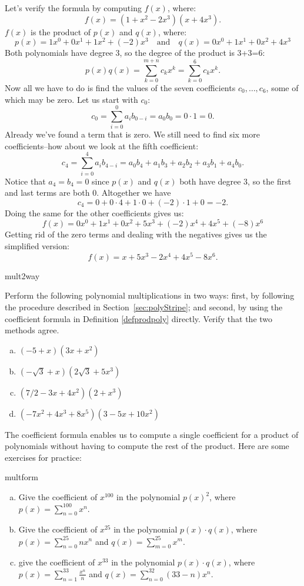 Let's verify the formula by computing $f(x)$, where:
\[ f(x)=(1+x^2-2x^3)(x+4x^3). \]
$f(x)$ is the product of $p(x)$ and $q(x)$, where:
\[p(x)= 1x^0 + 0x^1 + 1x^2 + (-2)x^3  \quad \text{and} \quad q(x)= 0x^0 + 1x^1 + 0x^2 + 4x^3 \]
Both polynomials have degree 3, so the degree of the product is 3+3=6:
\[
p(x) q(x) = \sum_{k=0}^{m+n} c_k  x^k =  \sum_{k=0}^{6} c_k x^k. 
\]
Now all we have to do is find the values of the seven coefficients $c_0, \ldots,c_6$, some of which may be zero.  Let us start with $c_0$:
\[ c_0 = \sum_{i = 0}^0 a_i b_{0 - i} = a_0b_0= 0 \cdot 1 = 0. \]
Already we've found a term that is zero.  We still need to find six more coefficients--how about we look at the fifth coefficient:
\[ c_4 =  \sum_{i = 0}^4 a_i b_{4 - i} =   a_0b_4 + a_1b_3 +a_2b_2 + a_3b_1 + a_4b_0.\]
Notice that $a_4=b_4=0$ since $p(x)$ and $q(x)$ both have degree 3, so the first and last terms are both 0. Altogether we have 
\[ c_4=0+0\cdot 4+1\cdot 0+(-2)\cdot 1+0=-2.\]
Doing the same for the other coefficients gives us:
\[f(x)= 0x^0+ 1x^1 + 0x^2 + 5x^3 + (-2)x^4 + 4x^5 + (-8)x^6 \]
Getting rid of the zero terms and dealing with the negatives gives us the simplified version:
\[f(x)=x+5x^3-2x^4+4x^5-8x^6. \]
\begin{exercise}{mult2way}

Perform the following polynomial multiplications in two ways: first, by following the procedure described in Section~\ref{sec:polyStripe}; and second, by using the coefficient formula in Definition \ref{defprodpoly} directly.  Verify that the two methods agree.
\begin{enumerate}[(a)]
\item
$(-5+x)(3x+ x^2)$
\item
$(-\sqrt{3}+x)(2\sqrt{3}+5x^3)$
\item
$(7/2- 3x+4x^2)(2+x^3)$
\item
$(- 7x^2 + 4x^3+8x^5 )(3-5x+10x^2 )$
\end{enumerate}
\end {exercise}

The coefficient formula enables us to compute a single coefficient for a product of polynomials without having 
to compute the rest of the product. Here are some exercises for practice:

\begin{exercise}{multform}
\begin{enumerate}[(a)]
\item
Give the coefficient of $x^{100}$ in the polynomial $p(x)^2$, where $p(x) = \sum_{n=0}^{100} x^n$.
\item
Give the coefficient of $x^{25}$ in the polynomial $p(x) \cdot q(x)$, where $p(x) = \sum_{n=0}^{25} nx^n$  and $q(x) = \sum_{m=0}^{25} x^m$.
\item
give the coefficient of $x^{33}$ in the polynomial 
$p(x) \cdot q(x)$, where  $p(x) = \sum_{n=1}^{33} \frac{x^n}{n}$ and  $q(x) = \sum_{n=0}^{32} (33-n)x^n$.
\end{enumerate}
\end {exercise}

